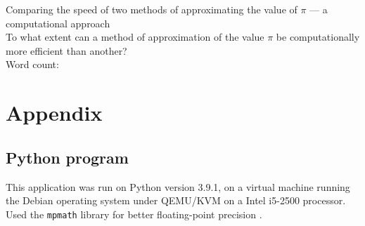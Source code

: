 \documentclass[12pt,a4paper]{article}
\begin{document}
\doublespacing %


\begin{titlepage}
    \begin{center}
    \vspace*{4cm}
        Comparing the speed of two methods of approximating the value of $\pi$ ---
        a computational approach\\
    \vspace{1cm}
    To what extent can a method of approximation of the value $\pi$ be computationally more efficient than another? \\
    \vspace{4cm}
    Word count: 
    \vfill
    \vspace{0.1cm}
    \end{center}
    \end{titlepage}



\begin{center}
\tableofcontents
\vspace{1in}

\end{center}



\newpage















\printbibliography[heading=bibintoc, title=Works Cited]

\appendix
\section{Appendix}
\label{app}
\subsection{Python program}
\label{app:scripts}
This application was run on Python version 3.9.1, on a virtual machine 
running the Debian operating system under QEMU/KVM on a Intel i5-2500 
processor. Used the \verb|mpmath| library for better floating-point 
precision \cite{mpmath}. 

\end{document}
